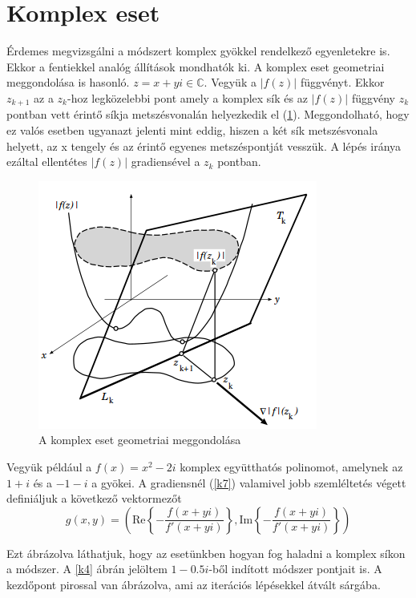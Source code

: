 \documentclass[a4paper,12pt]{report}
\begin{document}

		\section{Komplex eset}
			Érdemes megvizsgálni a módszert komplex gyökkel rendelkező egyenletekre is. Ekkor a fentiekkel analóg állítások mondhatók ki. A komplex eset geometriai meggondolása is hasonló. $z=x+yi\in \mathbb{C}$. Vegyük a $|f(z)|$ függvényt. Ekkor $z_{k+1}$ az a $z_k$-hoz legközelebbi pont amely a komplex sík és az $|f(z)|$ függvény $z_k$ pontban vett érintő síkja metszésvonalán helyezkedik el (\ref{k6}). Meggondolható, hogy ez valós esetben ugyanazt jelenti mint eddig, hiszen a két sík metszésvonala helyett, az x tengely és az érintő egyenes metszéspontját vesszük. A lépés iránya ezáltal ellentétes $|f(z)|$ gradiensével a $z_k$ pontban. \cite{Yau98}
            \begin{figure}[htp]
				\begin{center}
				\includegraphics[scale=0.6]{kep6.png}
				\caption{A komplex eset geometriai meggondolása \cite{Yau98}} \label{k6}
				\end{center}
			\end{figure}
            
            Vegyük például a $f(x)=x^2-2i$ komplex együtthatós polinomot, amelynek az $1+i$ és a $-1-i$ a gyökei. A gradiensnél (\ref{k7}) valamivel jobb szemléltetés végett definiáljuk a következő vektormezőt
			\[g(x,y)=\left(\mathrm{Re} \left\{ -\frac{f(x+yi)}{f'(x+yi)} \right \} ,\mathrm{Im} \left\{-\frac{f(x+yi)}{f'(x+yi)}\right \} \right)\]
			
			Ezt ábrázolva láthatjuk, hogy az esetünkben hogyan fog haladni a komplex síkon a módszer. A \ref{k4} ábrán jelöltem $1-0.5i$-ből indított módszer pontjait is. A kezdőpont pirossal van ábrázolva, ami az iterációs lépésekkel átvált sárgába.
			
\end{document}
